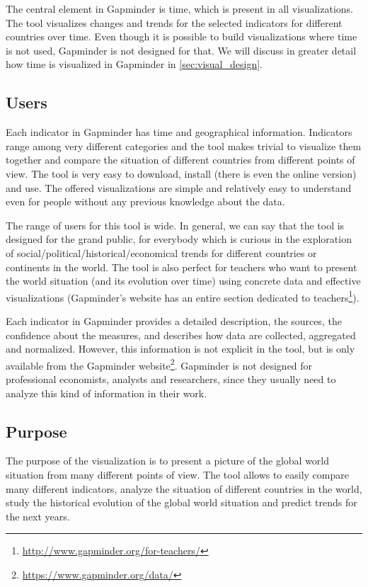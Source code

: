 \vspace{3mm}

The central element in Gapminder is time, which is present in all visualizations.
The tool visualizes changes and trends for the selected indicators for different countries over time.
Even though it is possible to build visualizations where time is not used, Gapminder is not designed for that.
We will discuss in greater detail how time is visualized in Gapminder in \cref{sec:visual_design}.


\subsection{Users}
Each indicator in Gapminder has time and geographical information.
Indicators range among very different categories and the tool makes trivial to visualize them together and compare the situation of different countries from different points of view.
The tool is very easy to download, install (there is even the online version) and use.
The offered visualizations are simple and relatively easy to understand even for people without any previous knowledge about the data.

The range of users for this tool is wide.
In general, we can say that the tool is designed for the grand public, for everybody which is curious in the exploration of social/political/historical/economical trends for different countries or continents in the world.
The tool is also perfect for teachers who want to present the world situation (and its evolution over time) using concrete data and effective visualizations 
(Gapminder's website has an entire section dedicated to teachers\footnote{\url{http://www.gapminder.org/for-teachers/}}).

Each indicator in Gapminder provides a detailed description, the sources, the confidence about the measures, and describes how data are collected, aggregated and normalized.
However, this information is not explicit in the tool, but is only available from the Gapminder website\footnote{\url{https://www.gapminder.org/data/}}.
Gapminder is not designed for professional economists, analysts and researchers, since they usually need to analyze this kind of information in their work.


\subsection{Purpose}
The purpose of the visualization is to present a picture of the global world situation from many different points of view.
The tool allows to easily compare many different indicators, analyze the situation of different countries in the world, study the historical evolution of the global world situation and predict trends for the next years.

